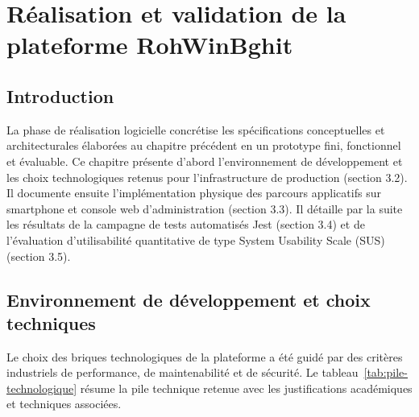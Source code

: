 \chapter{Réalisation et validation de la plateforme RohWinBghit}
\label{chap:realisation}

\section{Introduction}

La phase de réalisation logicielle concrétise les spécifications conceptuelles et architecturales élaborées au chapitre précédent en un prototype fini, fonctionnel et évaluable. Ce chapitre présente d'abord l'environnement de développement et les choix technologiques retenus pour l'infrastructure de production (section 3.2). Il documente ensuite l'implémentation physique des parcours applicatifs sur smartphone et console web d'administration (section 3.3). Il détaille par la suite les résultats de la campagne de tests automatisés Jest (section 3.4) et de l'évaluation d'utilisabilité quantitative de type System Usability Scale (SUS) (section 3.5).
\section{Environnement de développement et choix techniques}
\label{sec:technologies}

Le choix des briques technologiques de la plateforme a été guidé par des critères industriels de performance, de maintenabilité et de sécurité. Le tableau~\ref{tab:pile-technologique} résume la pile technique retenue avec les justifications académiques et techniques associées.

